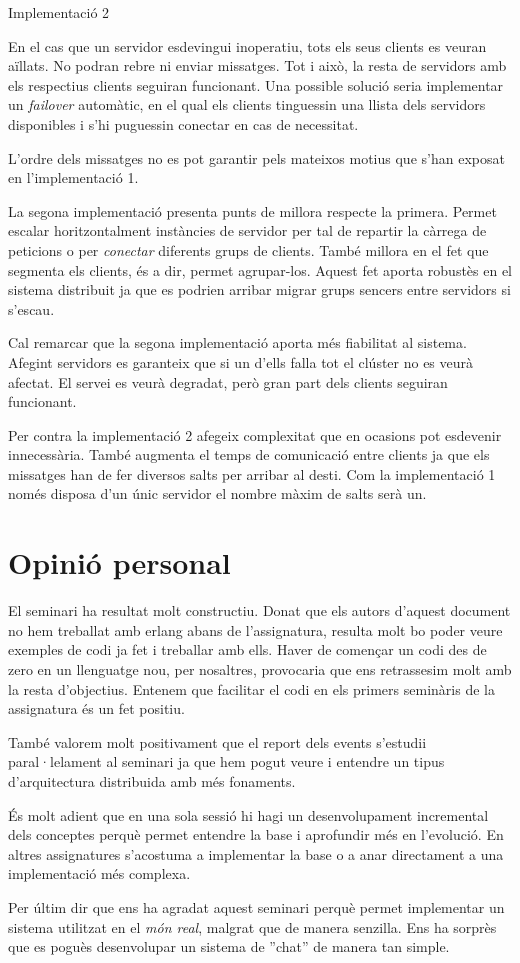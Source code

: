 \documentclass[a4paper, 11pt]{article}
\begin{document}
Implementació 2

En el cas que un servidor esdevingui inoperatiu, tots els seus clients es veuran aïllats. No podran rebre ni enviar missatges. Tot i això, la resta de servidors amb els respectius clients seguiran funcionant.
Una possible solució seria implementar un \textit{failover} autom\`atic, en el qual els clients tinguessin una llista dels servidors disponibles i s'hi puguessin conectar en cas de necessitat.

L'ordre dels missatges no es pot garantir pels mateixos motius que s'han exposat en l'implementació 1.

La segona implementació presenta punts de millora respecte la primera. Permet escalar horitzontalment instàncies de servidor per tal de repartir la càrrega de peticions o per \textit{conectar} diferents grups de clients. També millora en el fet que segmenta els clients, és a dir, permet agrupar-los. Aquest fet aporta robustès en el sistema distribuit ja que es podrien arribar migrar grups sencers entre servidors si s'escau. 

Cal remarcar que la segona implementació aporta més fiabilitat al sistema. Afegint servidors es garanteix que si un d'ells falla tot el clúster no es veurà afectat. El servei es veurà degradat, però gran part dels clients seguiran funcionant. 

Per contra la implementació 2 afegeix complexitat que en ocasions pot esdevenir innecessària. També augmenta el temps de comunicació entre clients ja que els missatges han de fer diversos salts per arribar al desti. Com la implementació 1 només disposa d'un únic servidor el nombre màxim de salts serà un. 


\section{Opinió personal}

El seminari ha resultat molt constructiu. Donat que els autors d'aquest document no hem treballat amb erlang abans de l'assignatura, resulta molt bo poder veure exemples de codi ja fet i treballar amb ells. Haver de començar un codi des de zero en un llenguatge nou, per nosaltres, provocaria que ens retrassesim molt amb la resta d'objectius. Entenem que facilitar el codi en els primers seminàris de la assignatura és un fet positiu. 

També valorem molt positivament que el report dels events s'estudii paral·lelament al seminari ja que hem pogut veure i entendre un tipus d'arquitectura distribuida amb més fonaments.

És molt adient que en una sola sessió hi hagi un desenvolupament incremental dels conceptes perquè permet entendre la base i aprofundir més en l'evolució. En altres assignatures s'acostuma a implementar la base o a anar directament a una implementació més complexa. 

Per últim dir que ens ha agradat aquest seminari perquè permet implementar un sistema utilitzat en el \textit{món real}, malgrat que de manera senzilla. Ens ha sorprès que es poguès desenvolupar un sistema de ''chat'' de manera tan simple.
\end{document}
